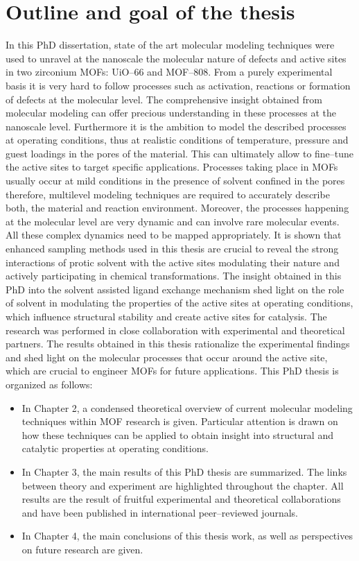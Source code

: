 \section{Outline and goal of the thesis}
In this PhD dissertation, state of the art molecular modeling techniques were used to unravel at the nanoscale the molecular nature of defects and active sites in two zirconium MOFs: UiO--66 and MOF--808. From a purely experimental basis it is very hard to follow processes such as activation, reactions or formation of defects at the molecular level. The comprehensive insight obtained from molecular modeling can offer precious understanding in these processes at the nanoscale level. Furthermore it is the ambition to model the described processes at operating conditions, thus at realistic conditions of temperature, pressure and guest loadings in the pores of the material. This can ultimately allow to fine--tune the active sites to target specific applications. 
Processes taking place in  MOFs usually occur at mild conditions in the presence of solvent confined in the pores therefore, multilevel modeling techniques are required to accurately describe both, the material and reaction environment. Moreover, the processes happening at the molecular level are very dynamic and can involve rare molecular events. All these complex dynamics need to be mapped appropriately. It is shown that enhanced sampling methods used in this thesis are crucial to reveal the strong interactions of protic solvent with the active sites modulating their nature and actively participating in chemical transformations. The insight obtained in this PhD into the solvent assisted ligand exchange mechanism shed light on the role of solvent in modulating the properties of the active sites at operating conditions, which influence structural stability and create active sites for catalysis. The research was performed in close collaboration with experimental and theoretical partners. The results obtained in this thesis rationalize the experimental findings and shed light on the molecular processes that occur around the active site, which are crucial to engineer MOFs for future applications.
This PhD thesis is organized as follows:
\begin{itemize}
\item In Chapter 2, a condensed theoretical overview of current molecular modeling techniques within MOF research is given. Particular attention is drawn on how these techniques can be applied to obtain insight into structural and catalytic properties at operating conditions.
\item In Chapter 3, the main results of this PhD thesis are summarized. The links between theory and experiment are highlighted throughout the chapter. All results are the result of fruitful experimental and theoretical collaborations and have been published in international peer--reviewed journals. 
\item In Chapter 4, the main conclusions of this thesis work, as well as perspectives on future research are given.
\end{itemize}

\clearpage{\pagestyle{empty}\cleardoublepage}
